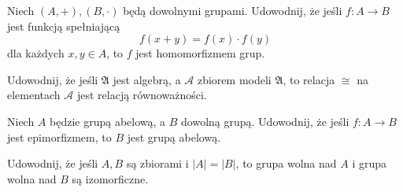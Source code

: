 \begin{exercise}
	Niech $(A, +), (B, \cdot)$ będą dowolnymi grupami.
	Udowodnij,
		że jeśli $f: A \to B$ jest funkcją spełniającą
	\begin{equation}
		f(x + y) = f(x) \cdot f(y)
	\end{equation}
	dla każdych $x, y \in A$, to $f$ jest homomorfizmem grup.
\end{exercise}

\begin{exercise}
	Udowodnij,
		że jeśli $\mathfrak{A}$ jest algebrą,
		a $\mathcal{A}$ zbiorem modeli $\mathfrak{A}$,
		to relacja $\cong$ na elementach $\mathcal{A}$ jest relacją równoważności.
\end{exercise}

\begin{exercise}
	Niech $A$ będzie grupą abelową, a $B$ dowolną grupą.
	Udowodnij, że jeśli $f: A \to B$ jest epimorfizmem,
		to $B$ jest grupą abelową.
\end{exercise}

\begin{exercise}
	Udowodnij, że jeśli $A, B$ są zbiorami i $|A| = |B|$,
		to grupa wolna nad $A$ i grupa wolna nad $B$ są izomorficzne.
\end{exercise}

